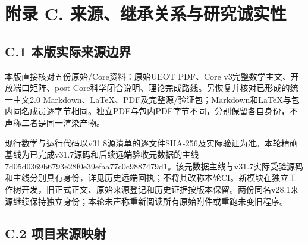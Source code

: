 \documentclass[
  11pt,
  oneside]{book}
\begin{document}
\hypertarget{appendix-c}{%
\chapter{附录 C. 来源、继承关系与研究诚实性}\label{appendix-c}}

\hypertarget{c.1-ux672cux7248ux5b9eux9645ux6765ux6e90ux8fb9ux754c}{%
\section{C.1
本版实际来源边界}\label{c.1-ux672cux7248ux5b9eux9645ux6765ux6e90ux8fb9ux754c}}

本版直接核对五份原始/Core资料：原始UEOT PDF、Core
v3完整数学主文、开放端口矩阵、post-Core科学闭合说明、理论完成路线。另恢复并核对已形成的统一主文2.0
Markdown、LaTeX、PDF及完整源/验证包；Markdown和LaTeX与包内同名成员逐字节相同。独立PDF与包内PDF字节不同，分别保留各自身份，不声称二者是同一渲染产物。

现行数学与运行代码以v31.8源清单的逐文件SHA-256及实际验证为准。本轮精确基线为已完成v31.7源码和后续远端验收元数据的主线7d05d0369b6793e28f0e39efaa77c0c9887479d1。该元数据主线与v31.7实际受验源码和主线分别具有身份，详见历史远端回执；不将其改称本轮CI。新模块在独立工作树开发，旧正式正文、原始来源登记和历史证据按版本保留。两份同名v28.1来源继续保持独立身份；本轮未声称重新阅读所有原始附件或重跑未变旧程序。

\hypertarget{c.2-ux9879ux76eeux6765ux6e90ux6620ux5c04}{%
\section{C.2
项目来源映射}\label{c.2-ux9879ux76eeux6765ux6e90ux6620ux5c04}}
\end{document}
